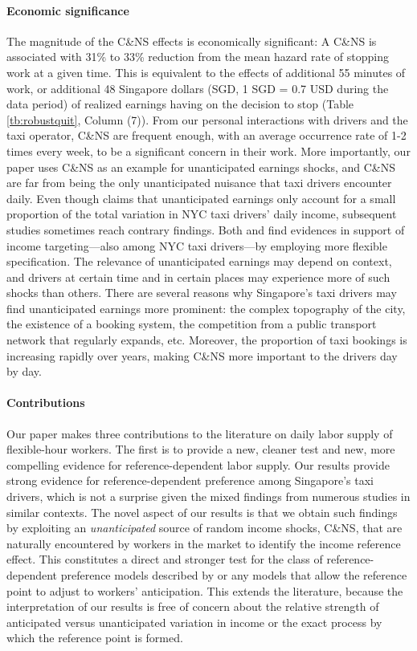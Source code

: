 \documentclass[reviewmode]{restat}
\begin{document}
\paragraph{Economic significance} The magnitude of the C\&NS effects is economically significant: A C\&NS
is associated with 31\% to 33\% reduction from the mean hazard rate of stopping work at a given time. 
This is equivalent to the effects of additional 55 minutes of work, or additional 48 Singapore dollars 
(SGD, 1 SGD = 0.7 USD during the data period) of realized earnings having on the decision to stop 
(Table \ref{tb:robustquit}, Column (7)). From our personal interactions with drivers and the taxi 
operator,  C\&NS are frequent enough, with an average occurrence rate of 1-2 times every
week, to be a significant concern in their work. More importantly, our paper uses C\&NS as an example
for unanticipated earnings shocks, and C\&NS are far from being the only unanticipated nuisance that 
taxi drivers encounter daily. Even though \cite{farber2015you} claims that  unanticipated earnings only
account for a small proportion of the total variation in NYC taxi drivers' daily income, subsequent 
studies sometimes reach contrary findings. Both \cite{thakral2018daily} and \cite{martin2017quit} 
find evidences in support of income targeting---also among NYC taxi drivers---by employing more flexible
specification. The relevance of unanticipated earnings may depend on context, and drivers at certain time 
and in certain places may experience more of such shocks than others. There are several reasons why 
Singapore's taxi drivers may find unanticipated earnings more prominent: the complex topography of 
the city, the existence of a booking system, the competition from a public transport network that 
regularly expands, etc. Moreover, the proportion of taxi bookings is increasing rapidly over years, 
making C\&NS more important to the drivers day by day. 

\paragraph{Contributions} Our paper makes three contributions to the literature on daily labor supply 
of flexible-hour workers. The first is to provide a new, cleaner test %
and new, more compelling evidence for reference-dependent labor supply. Our results provide strong evidence for reference-dependent 
preference among Singapore's taxi drivers, which is not a surprise given the mixed findings from numerous 
studies in similar contexts. The novel aspect of our results is that we obtain such findings by exploiting
an \textit{unanticipated} source of random income shocks, C\&NS, that are naturally encountered by workers
in the market to identify the income reference effect. This constitutes a direct and stronger test for the
class of reference-dependent preference models described by \citet{kHoszegi2006model} or any models that 
allow the reference point to adjust to workers' anticipation. This extends the literature, because the
interpretation of our results is free of concern about the relative strength of anticipated versus 
unanticipated variation in income or the exact process by which the reference point is formed.
\end{document}
